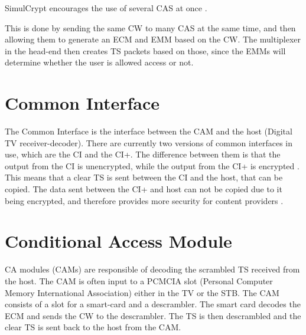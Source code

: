 SimulCrypt encourages the use of several CAS at once \citep[p. 17]{SimulCrypt:2008}. 

This is done by sending the same CW to many CAS at the same time, and then 
allowing them to generate an ECM and EMM based on the CW. The multiplexer in the 
head-end then creates TS packets based on those, since the EMMs will determine 
whether the user is allowed access or not. 

\section{Common Interface} \label{sec:CI}
The Common Interface is the interface between the CAM and the host (Digital TV 
receiver-decoder). There are currently two versions of common interfaces in use, 
which are the CI and the CI+. The difference between them is that the output 
from the CI is unencrypted, while the output from the CI+ is encrypted 
\citep{CI+:2011}. This means that a clear TS is sent between the CI and the 
host, that can be copied. The data sent between the CI+ and host can not be 
copied due to it being encrypted, and therefore provides more security for 
content providers \citep{CI:1997}.

\section{Conditional Access Module}\label{sec:CAM}
CA modules (CAMs) are responsible of decoding the scrambled TS received from 
the host. The CAM is often input to a PCMCIA slot (Personal Computer Memory 
International Association) either in the TV or the STB. The CAM consists of a 
slot for a smart-card and a descrambler. The smart card decodes the ECM and 
sends the CW to the descrambler. The TS is then descrambled and the clear TS is 
sent back to the host from the CAM.
